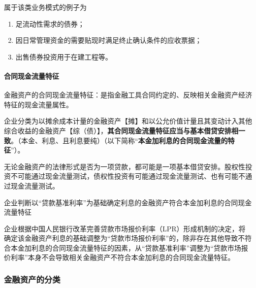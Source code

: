 \documentclass[UTF8,12pt]{ctexart}
\numberwithin{equation}{section} %
\numberwithin{figure}{section}
\numberwithin{table}{section}
\begin{document}
	属于该类业务模式的例子为
	\begin{enumerate}
		\item 足流动性需求的债券；
		
		\item 因日常管理资金的需要贴现时满足终止确认条件的应收票据；
		
		\item 出售债券投资用于在建工程等。
	\end{enumerate}
	
	\paragraph{合同现金流量特征}
	金融资产的合同现金流量特征：是指金融工具合同约定的、反映相关金融资产经济特征的现金流量属性。
	
	企业分类为以摊余成本计量的金融资产【摊】和以公允价值计量且其变动计入其他综合收益的金融资产【综（债）】，\textbf{其合同现金流量特征应当与基本借贷安排相一致}。（本金、利息、且利息要纯）（以下简称“\textbf{本金加利息的合同现金流量的特征}”）。
	
	无论金融资产的法律形式是否为一项贷款，都可能是一项基本借贷安排。股权性投资不可能通过现金流量测试，债权性投资有可能通过现金流量测试、也有可能不通过现金流量测试。
	
	企业判断以“贷款基准利率”为基础确定利息的金融资产符合本金加利息的合同现金流量特征
	
	企业根据中国人民银行改革完善贷款市场报价利率（LPR）形成机制的决定，将确定该金融资产利息的基础调整为“贷款市场报价利率”的，除非存在其他导致不符合本金加利息的合同现金流量特征的因素，从“贷款基准利率”调整为“贷款市场报价利率”本身不会导致相关金融资产不符合本金加利息的合同现金流量特征。
	
	
	
	\subsubsection{金融资产的分类}
	
\end{document}
